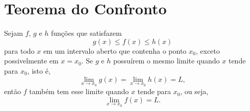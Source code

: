 \section{Teorema do Confronto}

\begin{frame}
  \begin{theorem}
  Sejam $f$, $g$ e $h$ funções que satisfazem
  \begin{equation*}
    g(x) \leq f(x) \leq h(x)
  \end{equation*}
  para todo $x$ em um intervalo aberto que contenha o ponto $x_{0}$, exceto possivelmente em $x=x_{0}$. Se $g$ e $h$ possuírem o mesmo limite quando $x$ tende para $x_{0}$, isto é,
  \begin{equation*}
    \lim_{x\to x_{0}}g(x) = \lim_{x\to x_{0}}h(x) = L,
  \end{equation*}
  então $f$ também tem esse limite quando $x$ tende para $x_{0}$, ou seja,
  \begin{equation*}
    \lim_{x\to x_{0}}f(x) = L.
  \end{equation*}
  \end{theorem}
\end{frame}

\begin{frame}[c]
  \begin{figure}
  \end{figure}
\end{frame}
